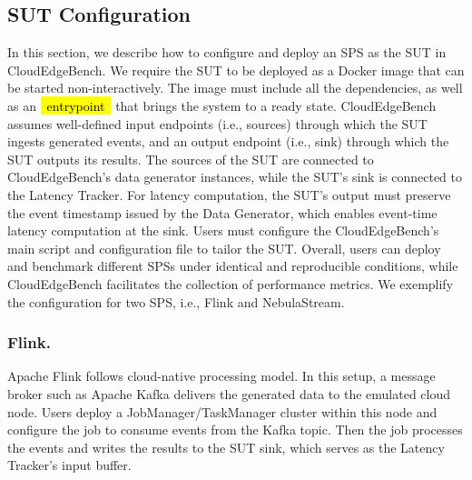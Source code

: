 \documentclass[runningheads]{llncs}
\newcommand*{\codebox}[1]{{\ttfamily\hyphenchar\font=45\relax\hl{~#1~}}}
\begin{document}







\subsection{SUT Configuration} \label{sec:how-to-integrate-sut}

In this section, we describe how to configure and deploy an SPS as the SUT in CloudEdgeBench.
We require the SUT to be deployed as a Docker image that can be started non-interactively.
The image must include all the dependencies, as well as an \codebox{entrypoint} that brings the system to a ready state.
CloudEdgeBench assumes well-defined input endpoints (i.e., sources) through which the SUT ingests generated events, and an output endpoint (i.e., sink) through which the SUT outputs its results.
The sources of the SUT are connected to CloudEdgeBench's data generator instances, while the SUT's sink is connected to the Latency Tracker.
For latency computation, the SUT's output must preserve the event timestamp issued by the Data Generator, which enables event-time latency computation at the sink.
Users must configure the CloudEdgeBench's main script and configuration file to tailor the SUT.
Overall, users can deploy and benchmark different SPSs under identical and reproducible conditions, while CloudEdgeBench facilitates the collection of performance metrics.
We exemplify the configuration for two SPS, i.e., Flink\cite{flink} and NebulaStream\cite{nebulastream}.

\subsubsection{Flink.}
Apache Flink follows cloud-native processing model.
In this setup, a message broker such as Apache Kafka delivers the generated data to the emulated cloud node.
Users deploy a JobManager/TaskManager cluster within this node and configure the job to consume events from the Kafka topic.
Then the job processes the events and writes the results to the SUT sink, which serves as the Latency Tracker's input buffer.
\end{document}
